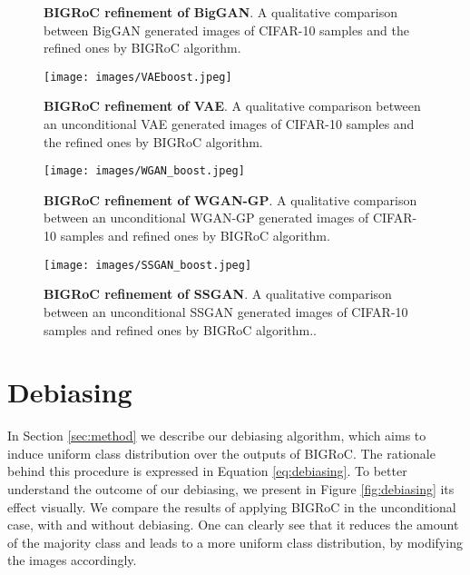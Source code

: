 \documentclass[10pt]{article} \usepackage[accepted]{tmlr}
\begin{document}
\begin{figure}[ht]
\centering
{}



\caption{\textbf{BIGRoC refinement of BigGAN}. A qualitative comparison between BigGAN generated images of CIFAR-10 samples and the refined ones by BIGRoC algorithm.}
\label{fig:bigGANqualitative}
\end{figure}

\begin{figure}[htb]
    \centering
    \texttt{[image: images/VAEboost.jpeg]}
    \caption{\textbf{BIGRoC refinement of VAE}. A qualitative comparison between an unconditional VAE generated images of CIFAR-10 samples and the refined ones by BIGRoC algorithm.
    }
    \label{fig:VAEqualitative}
\end{figure}

\begin{figure}[htb]
    \centering
    \texttt{[image: images/WGAN\_boost.jpeg]}
    \caption{\textbf{BIGRoC refinement of WGAN-GP}. A qualitative comparison between an unconditional WGAN-GP generated images of CIFAR-10 samples and refined ones by BIGRoC algorithm.
    }
    \label{fig:WGAN-GPqualitative}
\end{figure}

\begin{figure}[ht]
    \centering
    \texttt{[image: images/SSGAN\_boost.jpeg]}
    \caption{\textbf{BIGRoC refinement of SSGAN}. A qualitative comparison between an unconditional SSGAN generated images of CIFAR-10 samples and refined ones by BIGRoC algorithm..
    }
    \label{fig:SSGANqualitative}
\end{figure}

\section{Debiasing}
\label{sec:debiasing}
In Section \ref{sec:method} we describe our debiasing algorithm, which aims to induce uniform class distribution over the outputs of BIGRoC.
The rationale behind this procedure is expressed in Equation \ref{eq:debiasing}.
To better understand the outcome of our debiasing, we present in Figure \ref{fig:debiasing} its effect visually. 
We compare the results of applying BIGRoC in the unconditional case, with and without debiasing.
One can clearly see that it reduces the amount of the majority class and leads to a more uniform class distribution, by modifying the images accordingly.
\end{document}
